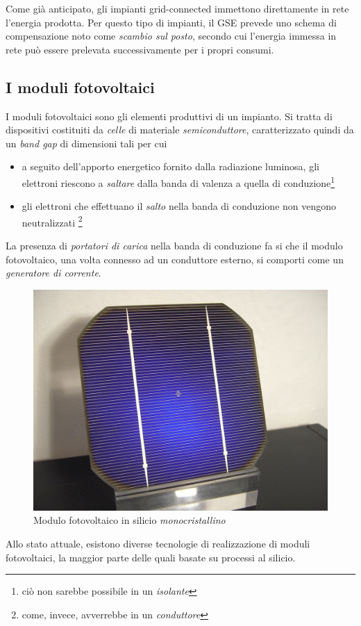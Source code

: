 %
Come gi\`a anticipato, gli impianti grid-connected immettono direttamente in rete 
l'energia prodotta. Per questo tipo di impianti, il GSE prevede uno schema di compensazione 
noto come \emph{scambio sul posto}\cite{scambioposto}, secondo cui l'energia immessa 
in rete pu\`o essere prelevata successivamente per i propri consumi.
%

%
\subsection{I moduli fotovoltaici}
I moduli fotovoltaici sono gli elementi produttivi di un impianto. 
Si tratta di dispositivi costituiti da \emph{celle} di materiale 
\emph{semiconduttore}, caratterizzato quindi da un \emph{band gap} 
di dimensioni tali per cui 
%
\begin{itemize}
\item a seguito dell'apporto energetico fornito dalla radiazione luminosa, 
      gli elettroni riescono a \emph{saltare} dalla banda di valenza a 
      quella di conduzione\footnote{ci\`o non sarebbe possibile in un \emph{isolante}}
%
\item gli elettroni che effettuano il \emph{salto} nella banda di conduzione 
      non vengono neutralizzati
      \footnote{come, invece, avverrebbe in un \emph{conduttore}}
\end{itemize}
%
La presenza di \emph{portatori di carica} nella banda di conduzione 
fa si che il modulo fotovoltaico, una volta connesso ad un conduttore 
esterno, si comporti come un \emph{generatore di corrente}\cite{bellini09}.
%
\begin{figure}[!h]
\centering
\includegraphics[width=350pt]{img/modulo-fotovoltaico.jpg}
\caption{Modulo fotovoltaico in silicio \emph{monocristallino}}
\end{figure}
%
Allo stato attuale, esistono diverse tecnologie di realizzazione di 
moduli fotovoltaici, la maggior parte delle quali basate su processi 
al silicio.
%

